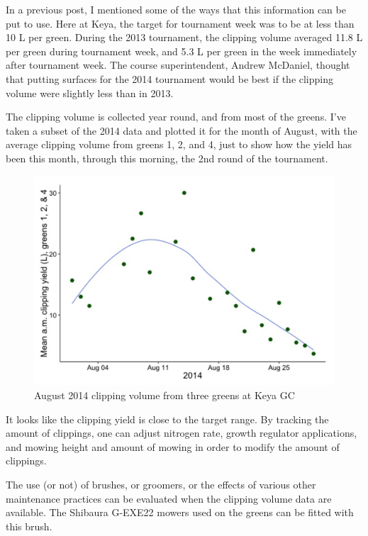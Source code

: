 \documentclass[12pt,b5,]{tufte-book}
\begin{document}
In a previous post, I mentioned some of the ways that this information can be put to use. Here at Keya, the target for tournament week was to be at less than 10 L per green. During the 2013 tournament, the clipping volume averaged 11.8 L per green during tournament week, and 5.3 L per green in the week immediately after tournament week. The course superintendent, Andrew McDaniel, thought that putting surfaces for the 2014 tournament would be best if the clipping volume were slightly less than in 2013.

The clipping volume is collected year round, and from most of the greens. I've taken a subset of the 2014 data and plotted it for the month of August, with the average clipping volume from greens 1, 2, and 4, just to show how the yield has been this month, through this morning, the 2nd round of the tournament.

\begin{figure}
\centering
\includegraphics{img/b2-3.png}
\caption{August 2014 clipping volume from three greens at Keya GC}
\end{figure}

It looks like the clipping yield is close to the target range. By tracking the amount of clippings, one can adjust nitrogen rate, growth regulator applications, and mowing height and amount of mowing in order to modify the amount of clippings.

The use (or not) of brushes, or groomers, or the effects of various other maintenance practices can be evaluated when the clipping volume data are available. The Shibaura G-EXE22 mowers used on the greens can be fitted with this brush.
\end{document}
